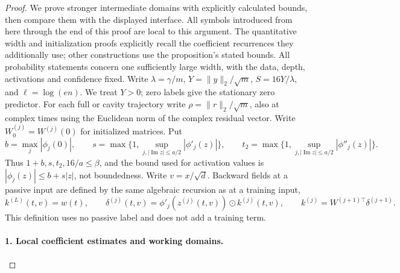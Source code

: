 \begin{proof}
We prove stronger intermediate domains with explicitly calculated bounds,
then compare them with the displayed interface.  All symbols introduced
from here through the end of this proof are local to this argument.
The quantitative width and initialization proofs explicitly recall the
coefficient recurrences they additionally use; other constructions use
the proposition's stated bounds.
All probability statements concern one sufficiently large width, with the
data, depth, activations and confidence fixed.  Write
\(\lambda=\gamma/m\), \(Y=\|y\|_2/\sqrt m\),
\(S=16Y/\lambda\), and \(\ell=\log(en)\).  We treat \(Y>0\);
zero labels give the stationary zero predictor.  For each full or cavity
trajectory write \(\rho=\|r\|_2/\sqrt m\), also at complex times using
the Euclidean norm of the complex residual vector.  Write
\(W_0^{(j)}=W^{(j)}(0)\) for initialized matrices.  Put
\[
 b=\max_j|\phi_j(0)|,\qquad
 s=\max\{1,\sup_{j,|\operatorname{Im}z|\le a/2}|\phi'_j(z)|\},
 \qquad
 t_2=\max\{1,\sup_{j,|\operatorname{Im}z|\le a/2}|\phi''_j(z)|\}.
\]
Thus \(1+b,s,t_2,16/a\le\beta\), and the bound used for
activation values is \(|\phi_j(z)|\le b+s|z|\), not boundedness.
Write \(v=x/\sqrt d\).  Backward fields at a passive input are defined
by the same algebraic recursion as at a training input,
\[
 k^{(L)}(t,v)=w(t),\qquad
 \delta^{(j)}(t,v)=\phi'_j(z^{(j)}(t,v))\odot k^{(j)}(t,v),
 \qquad k^{(j)}=W^{(j+1)\top}\delta^{(j+1)}.
\]
This definition uses no passive label and does not add a training term.

\paragraph{1. Local coefficient estimates and working domains.}
\label{cp:src-coefficients}


\end{proof}
